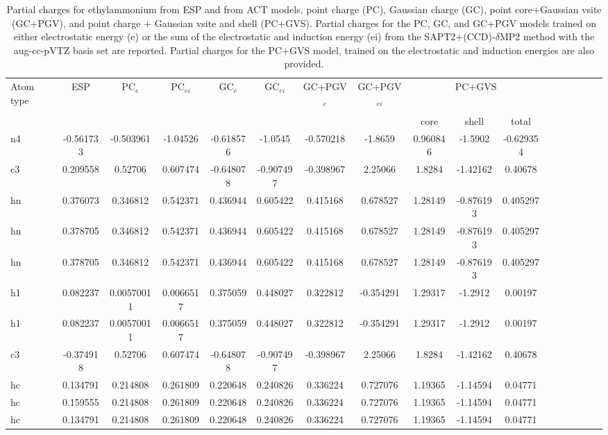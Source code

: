\begin{sidewaystable}
\caption{Partial charges for ethylammonium from ESP and from ACT models, point charge (PC), Gaussian charge (GC), point core+Gaussian vsite (GC+PGV), and point charge + Gaussian vsite and shell (PC+GVS).  Partial charges for the PC, GC, and GC+PGV models trained on either electrostatic energy (e) or the sum of the electrostatic and induction energy (ei) from the SAPT2+(CCD)-$\delta$MP2 method with the aug-cc-pVTZ basis set are reported. Partial charges for the PC+GVS model, trained on the electrostatic and induction energies are also provided.}
\hspace{-1cm}
\begin{tabular}{lcccccccccccccccc}
\hline
 Atom type & ESP & PC$_{e}$ & PC$_{ei}$ & GC$_{e}$ & GC$_{ei}$ & GC+PGV$_{e}$ & GC+PGV$_{ei}$ & \multicolumn{3}{c}{PC+GVS} \\\\
 & & & & & & & & core & shell & total \\
\hline
n4 & -0.561733 & -0.503961 & -1.04526 & -0.618576 & -1.0545 & -0.570218 & -1.8659 & 0.960846 & -1.5902 & -0.629354 \\
c3 & 0.209558 & 0.52706 & 0.607474 & -0.648078 & -0.907497 & -0.398967 & 2.25066 & 1.8284 & -1.42162 & 0.40678 \\
hn & 0.376073 & 0.346812 & 0.542371 & 0.436944 & 0.605422 & 0.415168 & 0.678527 & 1.28149 & -0.876193 & 0.405297 \\
hn & 0.378705 & 0.346812 & 0.542371 & 0.436944 & 0.605422 & 0.415168 & 0.678527 & 1.28149 & -0.876193 & 0.405297 \\
hn & 0.378705 & 0.346812 & 0.542371 & 0.436944 & 0.605422 & 0.415168 & 0.678527 & 1.28149 & -0.876193 & 0.405297 \\
h1 & 0.082237 & 0.00570011 & 0.0066517 & 0.375059 & 0.448027 & 0.322812 & -0.354291 & 1.29317 & -1.2912 & 0.00197 \\
h1 & 0.082237 & 0.00570011 & 0.0066517 & 0.375059 & 0.448027 & 0.322812 & -0.354291 & 1.29317 & -1.2912 & 0.00197 \\
c3 & -0.374918 & 0.52706 & 0.607474 & -0.648078 & -0.907497 & -0.398967 & 2.25066 & 1.8284 & -1.42162 & 0.40678 \\
hc & 0.134791 & 0.214808 & 0.261809 & 0.220648 & 0.240826 & 0.336224 & 0.727076 & 1.19365 & -1.14594 & 0.04771 \\
hc & 0.159555 & 0.214808 & 0.261809 & 0.220648 & 0.240826 & 0.336224 & 0.727076 & 1.19365 & -1.14594 & 0.04771 \\
hc & 0.134791 & 0.214808 & 0.261809 & 0.220648 & 0.240826 & 0.336224 & 0.727076 & 1.19365 & -1.14594 & 0.04771 \\
\hline
\end{tabular}
\end{sidewaystable}
